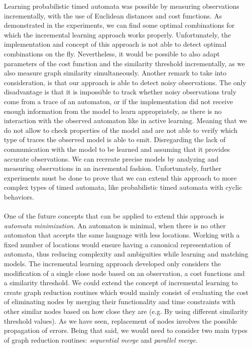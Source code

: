 Learning probabilistic timed automata was possible by measuring observations incrementally, with the use of Euclidean distances and cost functions. 
%
As demonstrated in the experiments, we can find some optimal combinations for which the incremental learning approach works properly.
% 
Unfortunately, the implementation and concept of this approach is not able to detect optimal combinations on the fly. 
%
Nevertheless, it would be possible to also adapt parameters of the cost function and the similarity threshold incrementally, as we also measure graph similarity simultaneously. 
%
Another remark to take into consideration, is that our approach is able to detect noisy observations. The only disadvantage is that it is impossible to track whether noisy observations truly come from a trace of an automaton, or if the implementation did not receive enough information from the model to learn appropriately, as there is no interaction with the observed automaton like in active learning. Meaning that we do not allow to check properties of the model and are not able to verify which type of traces the observed model is able to emit. 
%
Disregarding the lack of communication with the model to be learned and assuming that it provides accurate observations. We can recreate precise models by analyzing and measuring observations in an incremental fashion. Unfortunately, further experiments must be done to prove that we can extend this approach to more complex types of timed automata, like probabilistic timed automata with cyclic behaviors. \\\\
%
One of the future concepts that can be applied to extend this approach is \textit{automata minimization}. An automaton is minimal, when there is no other automaton that accepts the same language with less locations. Working with a fixed number of locations would ensure having a canonical representation of automata, thus reducing complexity and ambiguities while learning and matching models.
%
The incremental learning approach developed only considers the modification of a single close node based on an observation, a cost functions and a similarity threshold. 
%
We could extend the concept of incremental learning to create graph reduction routines which would mainly consist of evaluating the cost of eliminating nodes by merging their functionality and time constraints with other similar nodes based on how close they are (e.g. By using different similarity threshold values). 
%
As we have seen, replacement of nodes involves the possible propagation of errors. Being that said, we would need to consider two main types of graph reduction routines: \textit{sequential merge} and \textit{parallel merge}.
